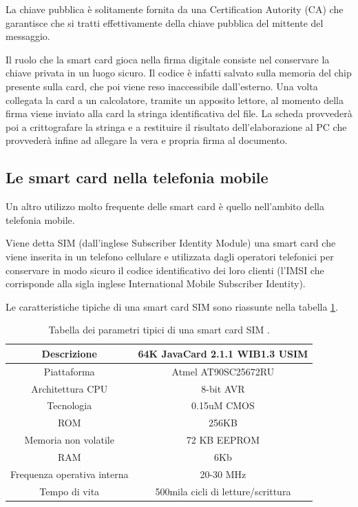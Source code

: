 La chiave pubblica è solitamente fornita da una Certification Autority (CA) che garantisce che si tratti effettivamente della chiave pubblica del mittente del messaggio.

Il ruolo che la smart card gioca nella firma digitale consiste nel conservare la chiave privata in un luogo sicuro. Il codice è infatti salvato sulla memoria del chip presente sulla card, che poi viene reso inaccessibile dall'esterno. Una volta collegata la card a un calcolatore, tramite un apposito lettore, al momento della firma viene inviato alla card la stringa identificativa del file. La scheda provvederà poi a crittografare la stringa e a restituire il risultato dell'elaborazione al PC che provvederà infine ad allegare la vera e propria firma al documento.
\cite{Wiki_fd}

\subsection{Le smart card nella telefonia mobile}
\label{applet_sim}
Un altro utilizzo molto frequente delle smart card è quello nell'ambito della telefonia mobile.

Viene detta SIM (dall'inglese Subscriber Identity Module) una smart card che viene inserita in un telefono cellulare e utilizzata dagli operatori telefonici per conservare in modo sicuro il codice identificativo dei loro clienti (l'IMSI che corrisponde alla sigla inglese International Mobile Subscriber Identity).

Le caratteristiche tipiche di una smart card SIM sono riassunte nella tabella \ref{parametri_SIM}.

\begin{table}[h!]
\centering
\begin{tabular}{ |c|c| } 
 \hline
 Descrizione &  64K JavaCard 2.1.1 WIB1.3 USIM \\
 \hline
 Piattaforma & Atmel AT90SC25672RU \\ 
 \hline
 Architettura CPU & 8-bit AVR \\ 
 \hline
 Tecnologia & 0.15uM CMOS \\ 
 \hline
 ROM & 256KB \\
 \hline
 Memoria non volatile & 72 KB EEPROM \\
 \hline
 RAM & 6Kb \\
 \hline
 Frequenza operativa interna & 20-30 MHz \\
 \hline
 Tempo di vita & 500mila cicli di letture/scrittura \\
 \hline
 
\end{tabular}
\caption{Tabella dei parametri tipici di una smart card SIM \cite{secret_life}.}
\label{parametri_SIM}
\end{table}


